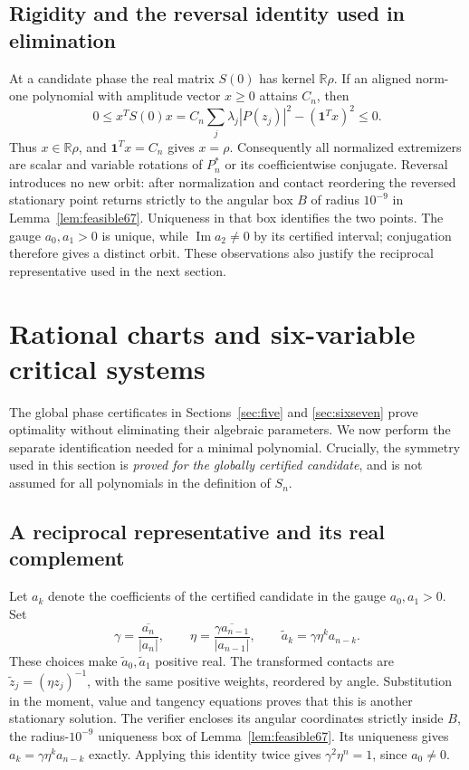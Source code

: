 \documentclass[11pt]{article}
\newcommand{\R}{\mathbb R}
\DeclareMathOperator{\Ima}{Im}
\begin{document}
\subsection{Rigidity and the reversal identity used in elimination}\label{sec:rigidity}
At a candidate phase the real matrix $S(0)$ has kernel $\R\rho$.
If an aligned norm-one polynomial with amplitude vector $x\ge0$ attains
$C_n$, then
\[
 0\le x^TS(0)x=C_n\sum_j\lambda_j|P(z_j)|^2-(\mathbf1^Tx)^2\le0.
\]
Thus $x\in\R\rho$, and $\mathbf1^Tx=C_n$ gives $x=\rho$.
Consequently all normalized extremizers are scalar and variable rotations
of $P_n^*$ or its coefficientwise conjugate. Reversal introduces no new orbit: after normalization and contact
reordering the reversed stationary point returns strictly to the angular
box $B$ of radius $10^{-9}$ in Lemma~\ref{lem:feasible67}.
Uniqueness in that box identifies the two points.
The gauge $a_0,a_1>0$ is unique, while $\Ima a_2\ne0$ by its certified
interval; conjugation therefore gives a distinct orbit. These observations
also justify the reciprocal representative used in the next section.


\section{Rational charts and six-variable critical systems}\label{sec:rational}
The global phase certificates in Sections~\ref{sec:five} and
\ref{sec:sixseven} prove optimality without eliminating their algebraic
parameters. We now perform the separate identification needed for a
minimal polynomial. Crucially, the symmetry used in this section is
\emph{proved for the globally certified candidate}, and is not assumed
for all polynomials in the definition of $S_n$.

\subsection{A reciprocal representative and its real complement}
Let $a_k$ denote the coefficients of the certified candidate in the
gauge $a_0,a_1>0$. Set
\[
 \gamma=\frac{\overline{a_n}}{|a_n|},\qquad
 \eta=\frac{\overline{\gamma a_{n-1}}}{|a_{n-1}|},\qquad
 \widetilde a_k=\gamma\eta^k a_{n-k}.
\]
These choices make $\widetilde a_0,\widetilde a_1$ positive real.
The transformed contacts are $\widetilde z_j=(\eta z_j)^{-1}$,
with the same positive weights, reordered by angle. Substitution in
the moment, value and tangency equations proves that this is another
stationary solution. The verifier encloses its angular coordinates
strictly inside $B$, the radius-$10^{-9}$ uniqueness box of
Lemma~\ref{lem:feasible67}. Its uniqueness gives
$a_k=\gamma\eta^k a_{n-k}$ exactly. Applying this identity twice
gives $\gamma^2\eta^n=1$, since $a_0\ne0$.
\end{document}
